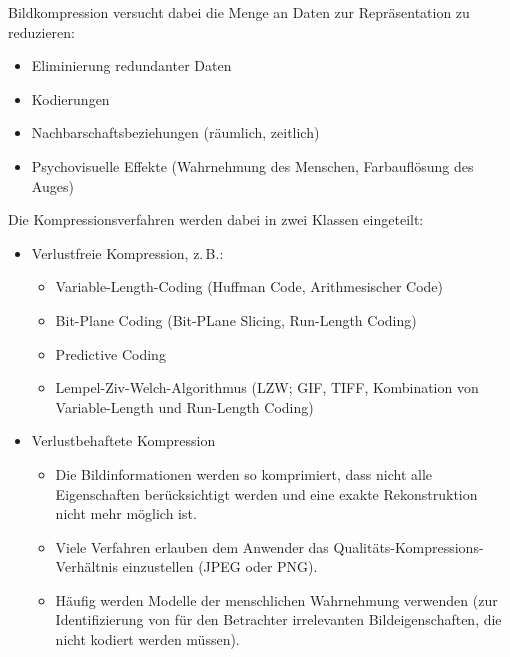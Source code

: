 		Bildkompression versucht dabei die Menge an Daten zur Repräsentation zu reduzieren:
		\begin{itemize}
			\item Eliminierung redundanter Daten
			\item Kodierungen
			\item Nachbarschaftsbeziehungen (räumlich, zeitlich)
			\item Psychovisuelle Effekte (Wahrnehmung des Menschen, Farbauflösung des Auges)
		\end{itemize}
		Die Kompressionsverfahren werden dabei in zwei Klassen eingeteilt:
		\begin{itemize}
			\item Verlustfreie Kompression, z.\,B.:
				\begin{itemize}
					\item Variable-Length-Coding (Huffman Code, Arithmesischer Code)
					\item Bit-Plane Coding (Bit-PLane Slicing, Run-Length Coding)
					\item Predictive Coding
					\item Lempel-Ziv-Welch-Algorithmus (LZW; GIF, TIFF, Kombination von Variable-Length und Run-Length Coding)
				\end{itemize}
			\item Verlustbehaftete Kompression
				\begin{itemize}
					\item Die Bildinformationen werden so komprimiert, dass nicht alle Eigenschaften berücksichtigt werden und eine exakte Rekonstruktion \ggf nicht mehr möglich ist.
					\item Viele Verfahren erlauben dem Anwender das Qualitäts-Kompressions-Verhältnis einzustellen (\zB JPEG oder PNG).
					\item Häufig werden Modelle der menschlichen Wahrnehmung verwenden (zur Identifizierung von für den Betrachter irrelevanten Bildeigenschaften, die nicht kodiert werden müssen).
				\end{itemize}
		\end{itemize}
	
